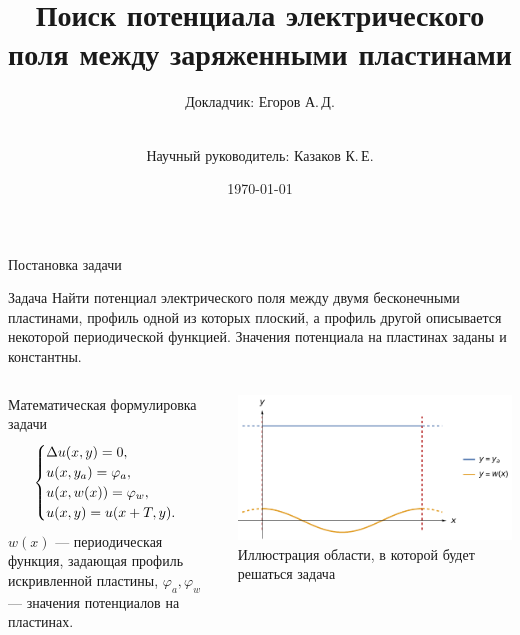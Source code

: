 \documentclass[ignoreonframetext,xcolor=table, unicode, 10pt]{beamer}
\title[Поиск потенциала электрического поля...]{Поиск потенциала электрического поля между заряженными пластинами}
\author[Егоров А.\,Д.]{Докладчик: Егоров А.\,Д.\and\\[0.5mm] Научный руководитель: Казаков К.\,Е.}
\institute[каф. Прикладная математика ФН-2]{Группа ФН2-62Б}
\date{\today}
\renewcommand{\phi}{\varphi}
\begin{document}
	
	\begin{frame}[plain]
		\large
		\maketitle
	\end{frame}

\begin{frame}{Постановка задачи}
			
	\begin{block}{Задача}
		Найти потенциал электрического поля между двумя бесконечными пластинами, профиль одной из которых плоский, а профиль другой описывается некоторой периодической функцией. Значения потенциала на пластинах заданы и константны.	
	\end{block}
	\vspace*{-2.0mm}
	\begin{columns}\vspace*{-2.0mm}
		\begin{block}{Математическая формулировка задачи}
			\begin{equation*}
				\begin{cases}
					\Delta u (x, y)  = 0, \\
					u (x, y_a) = \phi_a, \\
					u (x, w(x)) = \phi_w, \\
					u (x, y) = u (x + T, y).\\
				\end{cases}
				\vspace*{0mm}
			\end{equation*} 
			$w(x)$ --- периодическая функция, задающая профиль искривленной пластины, $\phi_a, \phi_w$ --- значения потенциалов на пластинах.
		\end{block}
			\centering
			\includegraphics[width=1\textwidth]{illustr.pdf}
			\flushleft
			Иллюстрация области, в которой будет решаться задача
		
		
	\end{columns}
	
	\normalsize
\end{frame}
\end{document}
